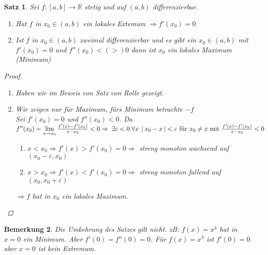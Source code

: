 \documentclass[a4paper,titlepage,oneside]{article}
\def\R{\ensuremath{\mathbb{R}} }
\renewcommand{\epsilon}{\ensuremath{\varepsilon} }
\def\sp{\hspace{0,1cm}}
\newcommand{\limAB}[3][x]{\ensuremath{\lim\limits_{#1 \rightarrow #2}{#3}}}
\newcommand{\limA}[2][x_0]{\limAB{#1}{#2}}
\newcommand{\abs}[1]{\ensuremath{\left|\:#1\:\right|}}
\theoremstyle{thmstyle}
\newtheorem{satz}{Satz}[section]
\newtheorem{bem}[satz]{Bemerkung}
\theoremstyle{subthmstyle}
\begin{document}
\begin{satz}
Sei $f : [a,b] \to \R $ stetig und auf $(a,b)$ differenzierbar.
\begin{enumerate}
\item Hat $f$ in $x_0 \in (a,b) $ ein lokales Extemum $ \Rightarrow f'(x_0) = 0$
\item Ist $f$ in $x_0 \in (a,b) $ zweimal differenzierbar und es gibt ein $x_0 \in (a,b)$ mit $f'(x_0) = 0$ und $f''(x_0) <(>) 0$ dann ist $x_0$ ein lokales Maximum (Minimum)
\end{enumerate}
\begin{proof}
\begin{enumerate}
\item Haben wir im Beweis von Satz von Rolle gezeigt.
\item Wir zeigen nur für Maximum, fürs Minimum betrachte $-f$\\
Sei $f'(x_0) = 0$ und $f''(x_0) < 0$. Da $f''(x_0) = \limA{\frac{f'(x) - f'(x_0)}{x - x_0}} < 0 \Rightarrow \sp \exists \epsilon < 0 \sp \forall x \sp \abs{x_0 - x} < \epsilon \text{ für } x_0 \ne x \text{ mit } \frac{f'(x) - f'(x_0)}{x - x_0} < 0$
\begin{enumerate}
\item[Fall 1] $x < x_0 \Rightarrow f'(x) > f'(x_0) = 0 \Rightarrow $ streng monoton wachsend auf $(x_0 - \epsilon, x_0)$
\item[Fall 2] $x > x_0 \Rightarrow f'(x) < f'(x_0) = 0  \Rightarrow $ streng monoton fallend auf $(x_0, x_0 + \epsilon)$
\end{enumerate}
$\Rightarrow f$ hat in $x_0$ ein lokales Maximum.
\end{enumerate}
\end{proof}
\end{satz}

\begin{bem}
Die Umkehrung des Satzes gilt nicht.
zB: $f(x) = x^4$ hat in $x = 0$ ein Minimum. Aber $f'(0) = f''(0) = 0$. Für $f(x) = x^3$ ist $f'(0) = 0$ aber $ x = 0$ ist kein Extremum.\\
\end{bem}
\end{document}
